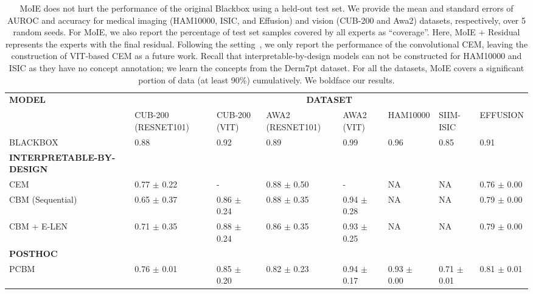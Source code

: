 \begin{table*}[t]
\caption{MoIE does not hurt the performance of the original Blackbox using a held-out test set. We 
provide the mean and standard errors of AUROC and accuracy for medical imaging (\eg HAM10000, ISIC, and Effusion) and vision (\eg CUB-200 and Awa2) datasets, respectively, over 5 random seeds. For MoIE, we also report the percentage of test set samples covered by all experts as ``coverage''. Here, MoIE + Residual represents the experts with the final residual. Following the setting~\cite{zarlenga2022concept}, we only report the performance of the convolutional CEM, leaving the construction of VIT-based CEM as a future work. Recall that interpretable-by-design models can not be constructed for HAM10000 and ISIC as they have no concept annotation; we learn the concepts from the Derm7pt dataset. For all the datasets, MoIE covers a significant portion of data (at least 90\%) cumulatively. We boldface our results. 
}
\fontsize{5pt}{0.20cm}\selectfont
\label{tab:performance}
\begin{center}
\begin{tabular}{p{25.5em} p{7.5em} p{7.5em} p{7.5em} p{7.5em} p{7.5em} p{7.5em} p{7.5em}}
\toprule 
        \textbf{MODEL} & \multicolumn{7}{c}{\textbf{DATASET}} \\
       & CUB-200 (RESNET101) & CUB-200 (VIT) & AWA2 (RESNET101) & AWA2 (VIT) & HAM10000 & SIIM-ISIC & EFFUSION  \\
\midrule 
    BLACKBOX & 0.88 & 0.92 & 0.89 & 0.99 & 0.96 & 0.85 & 0.91\\
\midrule
    \textbf{INTERPRETABLE-BY-DESIGN} \\
    CEM~\cite{zarlenga2022concept} & 0.77 $\pm$ 0.22 & - & 0.88 $\pm$ 0.50 & - & NA & NA & 0.76 $\pm$ 0.00\\
    CBM (Sequential)~\cite{koh2020concept} & 0.65 $\pm$ 0.37 & 0.86 $\pm$ 0.24 & 0.88 $\pm$ 0.35 & 0.94 $\pm$ 0.28  & NA & NA  
    & 0.79 $\pm$ 0.00 \\ 
    CBM + E-LEN~\cite{koh2020concept, barbiero2022entropy} & 0.71 $\pm$ 0.35 & 0.88 $\pm$ 0.24 & 0.86 $\pm$ 0.35 & 0.93 $\pm$ 0.25 & NA & NA & 
    0.79 $\pm$ 0.00  \\
\midrule
     \textbf{POSTHOC} \\
     PCBM~\cite{yuksekgonul2022post} & 0.76 $\pm$ 0.01  & 0.85 $\pm$ 0.20 & 0.82 $\pm$ 0.23 & 0.94 $\pm$ 0.17 &
     0.93 $\pm$	0.00 & 0.71 $\pm$	0.01 & 0.81 $\pm$	0.01\\

\end{tabular}
\end{center}
\end{table*}
